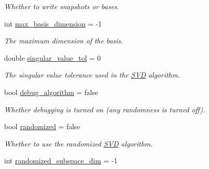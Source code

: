 \begin{DoxyCompactItemize}
\begin{DoxyCompactList}\small\item\em Whether to write snapshots or bases. \end{DoxyCompactList}\item 
\hypertarget{class_c_a_r_o_m_1_1_options_ad0857e9143399ed45372af5fc93fcc04}{int \hyperlink{class_c_a_r_o_m_1_1_options_ad0857e9143399ed45372af5fc93fcc04}{max\-\_\-basis\-\_\-dimension} = -\/1}\label{class_c_a_r_o_m_1_1_options_ad0857e9143399ed45372af5fc93fcc04}

\begin{DoxyCompactList}\small\item\em The maximum dimension of the basis. \end{DoxyCompactList}\item 
\hypertarget{class_c_a_r_o_m_1_1_options_a4ea6403c2691e27ae93e2c90278ddd07}{double \hyperlink{class_c_a_r_o_m_1_1_options_a4ea6403c2691e27ae93e2c90278ddd07}{singular\-\_\-value\-\_\-tol} = 0}\label{class_c_a_r_o_m_1_1_options_a4ea6403c2691e27ae93e2c90278ddd07}

\begin{DoxyCompactList}\small\item\em The singular value tolerance used in the \hyperlink{class_c_a_r_o_m_1_1_s_v_d}{S\-V\-D} algorithm. \end{DoxyCompactList}\item 
\hypertarget{class_c_a_r_o_m_1_1_options_a0ddd46bec99881ccc905c685fe566780}{bool \hyperlink{class_c_a_r_o_m_1_1_options_a0ddd46bec99881ccc905c685fe566780}{debug\-\_\-algorithm} = false}\label{class_c_a_r_o_m_1_1_options_a0ddd46bec99881ccc905c685fe566780}

\begin{DoxyCompactList}\small\item\em Whether debugging is turned on (any randomness is turned off). \end{DoxyCompactList}\item 
\hypertarget{class_c_a_r_o_m_1_1_options_a97db01507e0bf9e499ab2dc85237307e}{bool \hyperlink{class_c_a_r_o_m_1_1_options_a97db01507e0bf9e499ab2dc85237307e}{randomized} = false}\label{class_c_a_r_o_m_1_1_options_a97db01507e0bf9e499ab2dc85237307e}

\begin{DoxyCompactList}\small\item\em Whether to use the randomized \hyperlink{class_c_a_r_o_m_1_1_s_v_d}{S\-V\-D} algorithm. \end{DoxyCompactList}\item 
\hypertarget{class_c_a_r_o_m_1_1_options_a2d0dcbbbfc18af3d987cbb9f5d289cef}{int \hyperlink{class_c_a_r_o_m_1_1_options_a2d0dcbbbfc18af3d987cbb9f5d289cef}{randomized\-\_\-subspace\-\_\-dim} = -\/1}\label{class_c_a_r_o_m_1_1_options_a2d0dcbbbfc18af3d987cbb9f5d289cef}


\end{DoxyCompactItemize}
